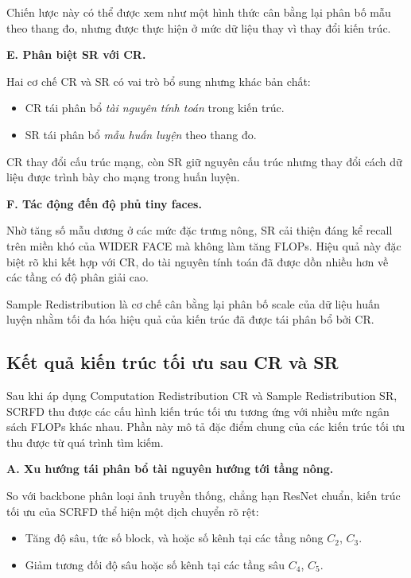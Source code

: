 Chiến lược này có thể được xem như một hình thức cân bằng lại phân bố mẫu theo thang đo, nhưng được thực hiện ở mức dữ liệu thay vì thay đổi kiến trúc.

\medskip
\noindent\textbf{E. Phân biệt SR với CR.}

Hai cơ chế CR và SR có vai trò bổ sung nhưng khác bản chất:

\begin{itemize}
  \item CR tái phân bổ \textit{tài nguyên tính toán} trong kiến trúc.
  \item SR tái phân bổ \textit{mẫu huấn luyện} theo thang đo.
\end{itemize}

CR thay đổi cấu trúc mạng, còn SR giữ nguyên cấu trúc nhưng thay đổi cách dữ liệu được trình bày cho mạng trong huấn luyện.

\medskip
\noindent\textbf{F. Tác động đến độ phủ tiny faces.}

Nhờ tăng số mẫu dương ở các mức đặc trưng nông, SR cải thiện đáng kể recall trên miền khó của WIDER FACE mà không làm tăng FLOPs. 
Hiệu quả này đặc biệt rõ khi kết hợp với CR, do tài nguyên tính toán đã được dồn nhiều hơn về các tầng có độ phân giải cao.

\medskip
\noindent
Sample Redistribution là cơ chế cân bằng lại phân bố scale của dữ liệu huấn luyện nhằm tối đa hóa hiệu quả của kiến trúc đã được tái phân bổ bởi CR.

\subsection{Kết quả kiến trúc tối ưu sau CR và SR}

Sau khi áp dụng Computation Redistribution CR và Sample Redistribution SR, SCRFD thu được các cấu hình kiến trúc tối ưu tương ứng với nhiều mức ngân sách FLOPs khác nhau. 
Phần này mô tả đặc điểm chung của các kiến trúc tối ưu thu được từ quá trình tìm kiếm.

\medskip
\noindent\textbf{A. Xu hướng tái phân bổ tài nguyên hướng tới tầng nông.}

So với backbone phân loại ảnh truyền thống, chẳng hạn ResNet chuẩn, kiến trúc tối ưu của SCRFD thể hiện một dịch chuyển rõ rệt:

\begin{itemize}
  \item Tăng độ sâu, tức số block, và hoặc số kênh tại các tầng nông $C_2$, $C_3$.
  \item Giảm tương đối độ sâu hoặc số kênh tại các tầng sâu $C_4$, $C_5$.
\end{itemize}


